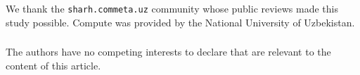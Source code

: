 \documentclass[runningheads]{llncs}
\begin{document}
\begin{credits}
\subsubsection{\ackname} We thank the \texttt{sharh.commeta.uz}
community whose public reviews made this study possible. Compute was
provided by the National University of Uzbekistan.

\subsubsection{\discintname} The authors have no competing interests to
declare that are relevant to the content of this article.
\end{credits}

\FloatBarrier


\end{document}
